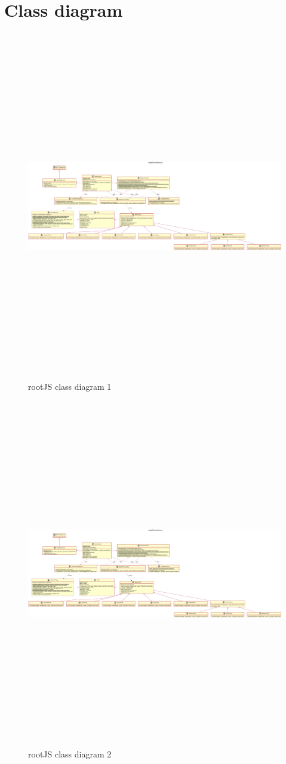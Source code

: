 \section{Class diagram} %

\begin{figure}
	\centering
	\includegraphics[width=7in, height=6in, trim=0 0 1200 0]{./latex/resources/architecture.pdf}
	\caption{rootJS class diagram 1}
\end{figure}


\newpage

\begin{figure}
	\centering
	\includegraphics[width=7in, height=6in, trim=1200 0 0 0]{./latex/resources/architecture.pdf}
	\caption{rootJS class diagram 2}
\end{figure}


\pagebreak
